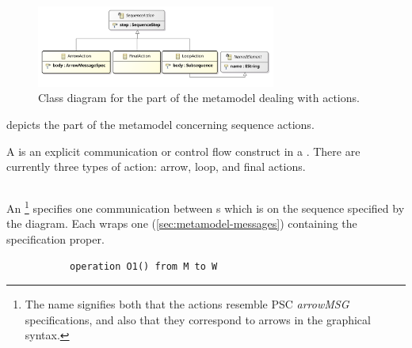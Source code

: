 \begin{figure}
	\centering
	\includegraphics[width=0.7\textwidth]{diagrams/Actions}
	\caption{Class diagram for the part of the \langname{} metamodel dealing with actions.}
	\label{fig:metamodel-actions}
\end{figure}

 depicts the part of the metamodel concerning
sequence actions.

A \msequenceaction{} is an explicit communication or control flow construct in a
\msubsequence.  There are currently three types of action: arrow, loop, and
final actions.

\subsection{\marrowaction}

An \marrowaction\footnote{The name signifies both that the actions resemble
PSC \emph{arrowMSG} specifications, and also that they correspond to arrows in
the graphical syntax.} specifies one communication between \mactor s which is on
the sequence specified by the diagram.  Each \marrowaction{} wraps one
\marrowmessagespec{} (\cref{sec:metamodel-messages})
containing the specification proper.

\begin{figure}[h]

\begin{subfigure}[t]{0.38\textwidth}
\begin{lstlisting}[style=Example]
operation O1() from M to W
\end{lstlisting}
\end{subfigure}
\hfill
\begin{subfigure}[t]{0.58\textwidth}
\gsecaption
\centering
{}
\end{subfigure}

\end{figure}

